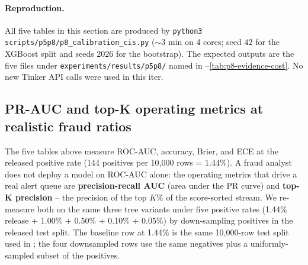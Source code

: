 \paragraph{Reproduction.} All five tables in this section are produced
by \texttt{python3 scripts/p5p8/p8\_calibration\_cis.py} ($\sim$3 min on
4 cores; seed $42$ for the XGBoost split and seeds $2026$ for the
bootstrap). The expected outputs are the five files under
\texttt{experiments/results/p5p8/} named in
--\ref{tab:p8-evidence-cost}. No new
Tinker API calls were used in this iter.

\subsection{PR-AUC and top-K operating metrics at realistic fraud ratios}
\label{sec:p8-evidence-realistic-ratios}

The five tables above measure ROC-AUC, accuracy, Brier, and ECE at the
released positive rate (144 positives per 10{,}000 rows = 1.44\%). A
fraud analyst does not deploy a model on ROC-AUC alone: the operating
metrics that drive a real alert queue are \textbf{precision-recall AUC}
(area under the PR curve) and \textbf{top-K precision} -- the precision
of the top $K\%$ of the score-sorted stream. We re-measure both on the
same three tree variants under five positive rates (1.44\% release +
1.00\% + 0.50\% + 0.10\% + 0.05\%) by down-sampling positives in the
released test split. The baseline row at 1.44\% is the same 10{,}000-row
test split used in ; the four downsampled
rows use the same negatives plus a uniformly-sampled subset of the
positives.

